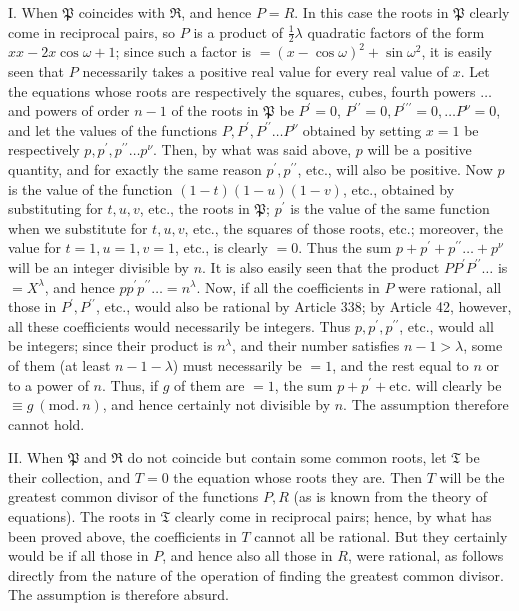 I. When \(\mathfrak P\) coincides with \(\mathfrak R\), and hence \(P=R\). In this case the roots in \(\mathfrak P\) clearly come in reciprocal pairs, so \(P\) is a product of \(\frac12\lambda\) quadratic factors of the form \(xx-2x\cos\omega+1\); since such a factor is \(=(x-\cos\omega)^2+\sin\omega^2\), it is easily seen that \(P\) necessarily takes a positive real value for every real value of \(x\). Let the equations whose roots are respectively the squares, cubes, fourth powers \(\ldots\) and powers of order \(n-1\) of the roots in \(\mathfrak P\) be \(P^{\prime}=0\), \(P^{\prime\prime}=0,\allowbreak P^{\prime\prime\prime}=0,\allowbreak \ldots P^\nu=0\), and let the values of the functions \(P,\allowbreak P^{\prime},\allowbreak P^{\prime\prime}\ldots P^\nu\) obtained by setting \(x=1\) be respectively \(p,\allowbreak p^{\prime},\allowbreak p^{\prime\prime}\ldots p^\nu\). Then, by what was said above, \(p\) will be a positive quantity, and for exactly the same reason \(p^{\prime},\allowbreak p^{\prime\prime}\), etc., will also be positive. Now \(p\) is the value of the function \((1-t)(1-u)(1-v)\), etc., obtained by substituting for \(t,\allowbreak u,\allowbreak v\), etc., the roots in \(\mathfrak P\); \(p^{\prime}\) is the value of the same function when we substitute for \(t,\allowbreak u,\allowbreak v\), etc., the squares of those roots, etc.; moreover, the value for \(t=1,\allowbreak u=1,\allowbreak v=1\), etc., is clearly \(=0\). Thus the sum \(p+p^{\prime}+p^{\prime\prime}\ldots+p^\nu\) will be an integer divisible by \(n\). It is also easily seen that the product \(PP^{\prime} P^{\prime\prime}\ldots\) is \(=X^\lambda\), and hence \(pp^{\prime} p^{\prime\prime}\ldots=n^\lambda\). Now, if all the coefficients in \(P\) were rational, all those in \(P^{\prime},\allowbreak P^{\prime\prime}\), etc., would also be rational by Article 338; by Article 42, however, all these coefficients would necessarily be integers. Thus \(p,\allowbreak p^{\prime},\allowbreak p^{\prime\prime}\), etc., would all be integers; since their product is \(n^\lambda\), and their number satisfies \(n-1>\lambda\), some of them (at least \(n-1-\lambda\)) must necessarily be \(=1\), and the rest equal to \(n\) or to a power of \(n\). Thus, if \(g\) of them are \(=1\), the sum \(p+p^{\prime}+\mathrm{etc.}\) will clearly be \(\equiv g\ (\mathrm{mod.}\ n)\), and hence certainly not divisible by \(n\). The assumption therefore cannot hold.

II. When \(\mathfrak P\) and \(\mathfrak R\) do not coincide but contain some common roots, let \(\mathfrak T\) be their collection, and \(T=0\) the equation whose roots they are. Then \(T\) will be the greatest common divisor of the functions \(P,\allowbreak R\) (as is known from the theory of equations). The roots in \(\mathfrak T\) clearly come in reciprocal pairs; hence, by what has been proved above, the coefficients in \(T\) cannot all be rational. But they certainly would be if all those in \(P\), and hence also all those in \(R\), were rational, as follows directly from the nature of the operation of finding the greatest common divisor. The assumption is therefore absurd.

